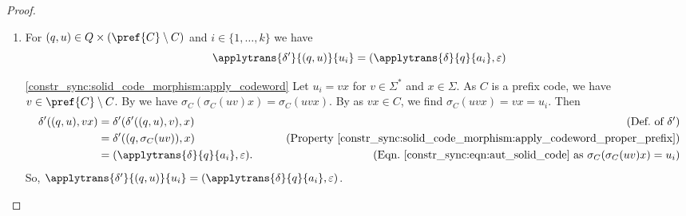 \begin{proof}
\begin{enumerate}
		\begin{proofitem}{\ref{constr_sync:solid_code_morphism:apply_codeword_proper_prefix}} 
		We show the claim by induction on $v$.
		As $\sigma_C(u) = u$, the claim is true for $v = \varepsilon$.
		Now, suppose $v = wx$ for $w \in \Sigma^*$ and $x \in \Sigma$.		
		As $C$ is overlap-free, 
		$wx \in \pref{C} \setminus C$ implies 
		$\sigma_C(uwx) \notin C$ and so $\sigma_C(uwx) \in \pref{C} \setminus C$;
		this implication is noted in .
		By~
		we have $\sigma_C(\sigma_C(uw)x) = \sigma_C(uwx)$.
		So, for $q \in Q$, we obtain		
		\begin{align*}
			& \delta'((q,u), wx) \\
			& = \delta'(\delta'((q,u), w), x) & \tag{Def.~of $\delta'$} \\
			& = \delta'((q, \sigma_C(uw)), x) & \tag{Induction hypothesis} \\
			& = (q, \sigma_C(\sigma_C(uw)x)). & \tag{Eqn.~\eqref{constr_sync:eqn:aut_solid_code} as $\sigma_C(\sigma_C(uw)x) \notin C$} 
		\end{align*}
		Hence, we get $ \delta((q,u), wx) = (q, \sigma_C(uwx))$
        and the claim follows by induction.
     	\end{proofitem}
		
		\item \label{constr_sync:solid_code_morphism:apply_codeword}
		For $(q, u) \in Q \times ( \pref{C} \setminus C )$ and $i \in \{1,\ldots,k\}$ we have
		\[
		\applytrans{\delta'}{(q,u)}{u_i} = (\applytrans{\delta}{q}{a_i}, \varepsilon) 
		\]
		
		\begin{proofitem}{\ref{constr_sync:solid_code_morphism:apply_codeword}}
		Let $u_i = vx$ for $v \in \Sigma^*$ and $x \in \Sigma$.
		As $C$ is a prefix code, we have $v \in \pref{C} \setminus C$.		
		By 
		we have $\sigma_C(\sigma_C(uv)x) = \sigma_C(uvx)$.
		By 
		as $vx \in C$, we find $\sigma_C(uvx) = vx = u_i$. Then
		\begin{align*}
			\delta'((q, u), vx) & = \delta'(\delta'((q,u), v), x)  & \tag{Def.~of $\delta'$} \\
			& = \delta'((q, \sigma_C(uv)), x) & \tag{Property~\ref{constr_sync:solid_code_morphism:apply_codeword_proper_prefix}} \\
			& = (\applytrans{\delta}{q}{a_i}, \varepsilon). & \tag{Eqn.~\eqref{constr_sync:eqn:aut_solid_code} as $\sigma_C(\sigma_C(uv)x)  = u_i$}
		\end{align*}
	    So, $\applytrans{\delta'}{(q,u)}{u_i} = (\applytrans{\delta}{q}{a_i}, \varepsilon)$.
		\end{proofitem}
		

\end{enumerate}
\end{proof}
